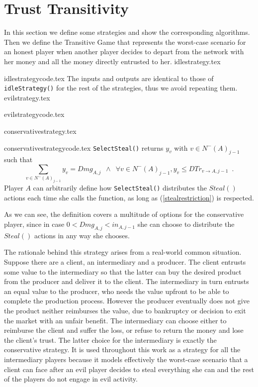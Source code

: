 \section{Trust Transitivity}
  In this section we define some strategies and show the corresponding algorithms. Then we define the
  Transitive Game that represents the worst-case scenario for an honest player when another player decides to depart from
  the network with her money and all the money directly entrusted to her.
  {idlestrategy.tex}

  {idlestrategycode.tex}
  The inputs and outputs are identical to those of \texttt{idleStrategy()} for the rest of the strategies, thus we avoid
  repeating them.
  {evilstrategy.tex}

  {evilstrategycode.tex}

  {conservativestrategy.tex}

  {conservativestrategycode.tex}
  \texttt{SelectSteal()} returns $y_v$ with $v \in N^{-}\left(A\right)_{j-1}$ such that
  \begin{equation}
  \label{stealrestriction}
     \sum\limits_{v \in N^{-}\left(A\right)_{j-1}}y_v = Dmg_{A, j} \enspace \wedge \enspace \forall v \in N^{-}\left(A\right)_{j-1},
     y_v \leq DTr_{v \rightarrow A, j-1} \enspace.
  \end{equation}
  Player $A$ can arbitrarily define how \texttt{SelectSteal()} distributes the $Steal\left(\right)$ actions
  each time she calls the function, as long as (\ref{stealrestriction}) is respected. 

  As we can see, the definition covers a multitude of options for the conservative player, since in case $0 < Dmg_{A,j}
  < in_{A,j-1}$ she can choose to distribute the $Steal\left(\right)$ actions in any way she chooses.

  The rationale behind this strategy arises from a real-world common situation. Suppose there are a client, an
  intermediary and a producer. The client entrusts some value to the intermediary so that the latter can buy the desired
  product from the producer and deliver it to the client. The intermediary in turn entrusts an equal value to the
  producer, who needs the value upfront to be able to complete the production process. However the producer eventually
  does not give the product neither reimburses the value, due to bankruptcy or decision to exit the market with an unfair
  benefit. The intermediary can choose either to reimburse the client and suffer the loss, or refuse to return the money
  and lose the client's trust. The latter choice for the intermediary is exactly the conservative strategy. It is used
  throughout this work as a strategy for all the intermediary players because it models effectively the worst-case
  scenario that a client can face after an evil player decides to steal everything she can and the rest of the players do
  not engage in evil activity.

